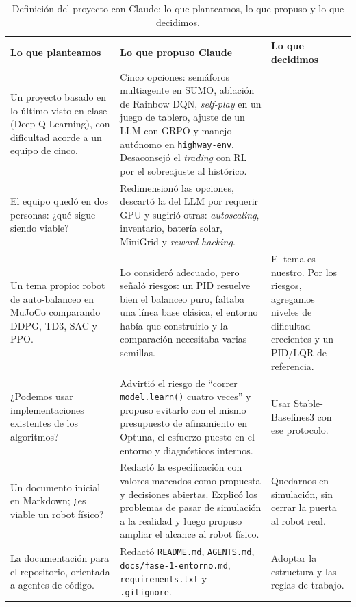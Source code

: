 \documentclass[11pt,a4paper]{article}
\newcommand{\code}[1]{\texttt{#1}}
\begin{document}
\begin{table}[H]
\centering
\caption{Definición del proyecto con Claude: lo que planteamos, lo que propuso y lo que decidimos.}
\label{tab:etapa1}
\small
\begin{tabularx}{\textwidth}{@{}>{\raggedright\arraybackslash}p{3.9cm}YY@{}}
\toprule
Lo que planteamos & Lo que propuso Claude & Lo que decidimos \\
\midrule
Un proyecto basado en lo último visto en clase (Deep Q-Learning), con dificultad acorde a un equipo de cinco. & Cinco opciones: semáforos multiagente en SUMO, ablación de Rainbow DQN, \emph{self-play} en un juego de tablero, ajuste de un LLM con GRPO y manejo autónomo en \code{highway-env}. Desaconsejó el \emph{trading} con RL por el sobreajuste al histórico. & --- \\
El equipo quedó en dos personas: ¿qué sigue siendo viable? & Redimensionó las opciones, descartó la del LLM por requerir GPU y sugirió otras: \emph{autoscaling}, inventario, batería solar, MiniGrid y \emph{reward hacking}. & --- \\
Un tema propio: robot de auto-balanceo en MuJoCo comparando DDPG, TD3, SAC y PPO. & Lo consideró adecuado, pero señaló riesgos: un PID resuelve bien el balanceo puro, faltaba una línea base clásica, el entorno había que construirlo y la comparación necesitaba varias semillas. & El tema es nuestro. Por los riesgos, agregamos niveles de dificultad crecientes y un PID/LQR de referencia. \\
¿Podemos usar implementaciones existentes de los algoritmos? & Advirtió el riesgo de ``correr \code{model.learn()} cuatro veces'' y propuso evitarlo con el mismo presupuesto de afinamiento en Optuna, el esfuerzo puesto en el entorno y diagnósticos internos. & Usar Stable-Baselines3 con ese protocolo. \\
Un documento inicial en Markdown; ¿es viable un robot físico? & Redactó la especificación con valores marcados como propuesta y decisiones abiertas. Explicó los problemas de pasar de simulación a la realidad y luego propuso ampliar el alcance al robot físico. & Quedarnos en simulación, sin cerrar la puerta al robot real. \\
La documentación para el repositorio, orientada a agentes de código. & Redactó \code{README.md}, \code{AGENTS.md}, \code{docs/fase-1-entorno.md}, \code{requirements.txt} y \code{.gitignore}. & Adoptar la estructura y las reglas de trabajo. \\
\bottomrule
\end{tabularx}
\end{table}
\end{document}
